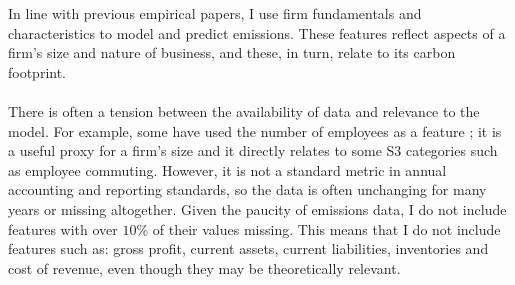 \documentclass[12pt,twoside]{report}
\begin{document}
In line with previous empirical papers, I use firm fundamentals and characteristics to model and predict emissions. These features reflect aspects of a firm's size and nature of business, and these, in turn, relate to its carbon footprint. 
\\\\
There is often a tension between the availability of data and relevance to the model. For example, some have used the number of employees as a feature \cite{nguyen2021}; it is a useful proxy for a firm's size and it directly relates to some S3 categories such as employee commuting. However, it is not a standard metric in annual accounting and reporting standards, so the data is often unchanging for many years or missing altogether. Given the paucity of emissions data, I do not include features with over $10\%$ of their values missing. This means that I do not include features such as: gross profit, current assets, current liabilities, inventories and cost of revenue, even though they may be theoretically relevant. 
\end{document}
